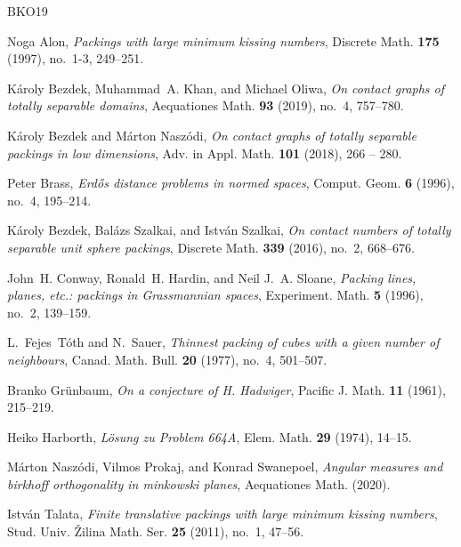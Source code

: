 \documentclass[a4paper,12pt]{article}
\theoremstyle{plain}
\theoremstyle{definition}
\begin{document}
\begin{thebibliography}{BKO19}

Noga Alon, \emph{Packings with large minimum kissing numbers}, Discrete Math.
  \textbf{175} (1997), no.~1-3, 249--251. 

K{\'a}roly Bezdek, Muhammad~A. Khan, and Michael Oliwa, \emph{On contact graphs
  of totally separable domains}, Aequationes Math. \textbf{93} (2019), no.~4,
  757--780.

K\'aroly Bezdek and M\'arton Nasz\'odi, \emph{On contact graphs of totally
  separable packings in low dimensions}, Adv. in Appl. Math. \textbf{101}
  (2018), 266 -- 280.

Peter Brass, \emph{Erd{\H{o}}s distance problems in normed spaces}, Comput.
  Geom. \textbf{6} (1996), no.~4, 195--214.

K\'{a}roly Bezdek, Bal\'{a}zs Szalkai, and Istv\'{a}n Szalkai, \emph{On contact
  numbers of totally separable unit sphere packings}, Discrete Math.
  \textbf{339} (2016), no.~2, 668--676.

John~H. Conway, Ronald~H. Hardin, and Neil J.~A. Sloane, \emph{Packing lines,
  planes, etc.: packings in {G}rassmannian spaces}, Experiment. Math.
  \textbf{5} (1996), no.~2, 139--159. 

L.~Fejes~T\'{o}th and N.~Sauer, \emph{Thinnest packing of cubes with a given
  number of neighbours}, Canad. Math. Bull. \textbf{20} (1977), no.~4,
  501--507. 

Branko Gr{\"u}nbaum, \emph{On a conjecture of {H}. {H}adwiger}, Pacific J.
  Math. \textbf{11} (1961), 215--219. 

Heiko Harborth, \emph{L\"osung zu {Problem} {664A}}, Elem. Math. \textbf{29}
  (1974), 14--15.

M{\'a}rton Nasz{\'o}di, Vilmos Prokaj, and Konrad Swanepoel, \emph{Angular
  measures and birkhoff orthogonality in minkowski planes}, Aequationes Math.
  (2020).

Istv\'{a}n Talata, \emph{Finite translative packings with large minimum kissing
  numbers}, Stud. Univ. \v{Z}ilina Math. Ser. \textbf{25} (2011), no.~1,
  47--56. 

\end{thebibliography}
\end{document}
